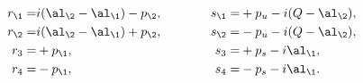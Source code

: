 \begin{equation}  
\begin{aligned} r_\1=& i(\al_\2-\al_\1)-p_\2,\\
         r_\2=& i(\al_\2-\al_\1)+p_\2, \\
         r_3=& +p_\1,\\
        r_4=& -p_\1,
\end{aligned}\qquad\qquad
\begin{aligned} 
       s_\1=& +p_u-i(Q-\al_\2),\\
         s_\2=& -p_u-i(Q-\al_\2),\\
         s_3=& +p_s-i\al_\1,\\
        s_4=& -p_s-i\al_\1. 
\end{aligned}
\end{equation}

